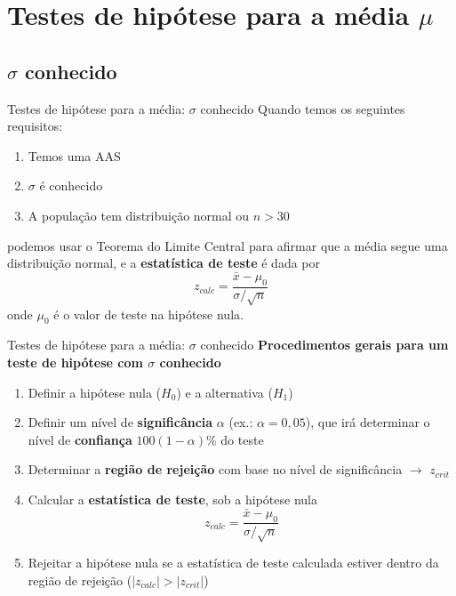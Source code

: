 \documentclass[10pt]{beamer}\usepackage[]{graphicx}\usepackage[]{color}
\theoremstyle{definition}
\begin{document}
\section{Testes de hipótese para a média $\mu$}

\subsection{$\sigma$ conhecido}

\begin{frame}{Testes de hipótese para a média: $\sigma$ conhecido}
  Quando temos os seguintes requisitos:
  \begin{enumerate}
  \item Temos uma AAS
  \item $\sigma$ é conhecido
  \item A população tem distribuição normal ou $n>30$
  \end{enumerate}
  podemos usar o Teorema do Limite Central para afirmar que a média
  segue uma distribuição normal, e a \textbf{estatística de teste} é
  dada por
  \begin{equation*}
    z_{calc} = \frac{\bar{x} - \mu_0}{\sigma/\sqrt{n}}
  \end{equation*}
  onde $\mu_0$ é o valor de teste na hipótese nula.
\end{frame}

\begin{frame}{Testes de hipótese para a média: $\sigma$ conhecido}
  \textbf{Procedimentos gerais para um teste de hipótese com $\sigma$
    conhecido}
\begin{enumerate}
\item Definir a hipótese nula ($H_0$) e a alternativa ($H_1$)
\item Definir um nível de \textbf{significância} $\alpha$ (ex.: $\alpha
  = 0,05$), que irá determinar o nível de \textbf{confiança}
  $100(1-\alpha)\%$ do teste
\item Determinar a \textbf{região de rejeição} com base no nível de
  significância $\rightarrow$ $z_{crit}$
\item Calcular a \textbf{estatística de teste}, sob a hipótese nula
  \begin{equation*}
    z_{calc} = \frac{\bar{x} - \mu_0}{\sigma/\sqrt{n}}
  \end{equation*}
\item Rejeitar a hipótese nula se a estatística de teste calculada
  estiver dentro da região de rejeição ($|z_{calc}| > |z_{crit}|$)
\end{enumerate}
\end{frame}
\end{document}
